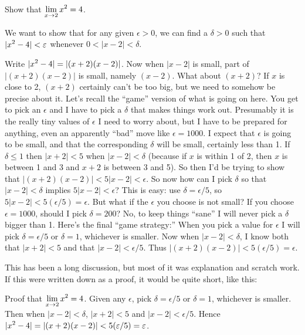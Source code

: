 \begin{example} Show that $\displaystyle \lim_{x\to 2} x^2=4$.
 
We want to show that for any given $\epsilon>0$, we can find a
$\delta>0$ such that $\displaystyle |x^2-4|<\varepsilon$ whenever $0<|x-2|<\delta$.

Write $\displaystyle |x^2-4|=|(x+2)(x-2)|$. Now when $|x-2|$ is small, part of
$|(x+2)(x-2)|$ is small, namely $(x-2)$. What about $(x+2)$? If $x$ is
close to 2, $(x+2)$ certainly can't be too big, but we need to somehow
be precise about it. Let's recall the ``game'' version of what is
going on here. You get to pick an $\epsilon$ and I have to pick a
$\delta$ that makes things work out. Presumably it is the really tiny
values of $\epsilon$ I need to worry about, but I have to be prepared
for anything, even an apparently ``bad'' move like $\epsilon=1000$.  I
expect that $\epsilon$ is going to be small, and that the
corresponding $\delta$ will be small, certainly less than 1.  If
$\delta\le 1$ then $|x+2|<5$ when $|x-2|<\delta$ (because if $x$ is
within 1 of 2, then $x$ is between 1 and 3 and $x+2$ is between 3 and
5). So then I'd be trying to show that
$|(x+2)(x-2)|<5|x-2|<\epsilon$. So now how can I pick $\delta$ so that
$|x-2|<\delta$ implies $5|x-2|<\epsilon$? This is easy: use
$\delta=\epsilon/5$, so $5|x-2|<5(\epsilon/5) = \epsilon$. But what if
the $\epsilon$ you choose is not small? If you choose $\epsilon=1000$,
should I pick $\delta=200$? No, to keep things ``sane'' I will never
pick a $\delta$ bigger than 1. Here's the final ``game strategy:''
When you pick a value for $\epsilon$ I will pick $\delta=\epsilon/5$
or $\delta=1$, whichever is smaller. Now when $|x-2|<\delta$, I know
both that $|x+2|<5$ and that $|x-2|<\epsilon/5$. Thus
$|(x+2)(x-2)|<5(\epsilon/5) = \epsilon$.

This has been a long discussion, but most of it was explanation and
scratch work. If this were written down as a proof, it would be quite
short, like this:

Proof that $\displaystyle \lim_{x\to 2}x^2=4$. Given any $\epsilon$, pick
$\delta=\epsilon/5$ or $\delta=1$, whichever is smaller. Then when
$|x-2|<\delta$, $|x+2|<5$ and
$|x-2|<\epsilon/5$. Hence $\displaystyle |x^2-4|=|(x+2)(x-2)|<5(\varepsilon/5) =
\varepsilon$. 
\end{example}







